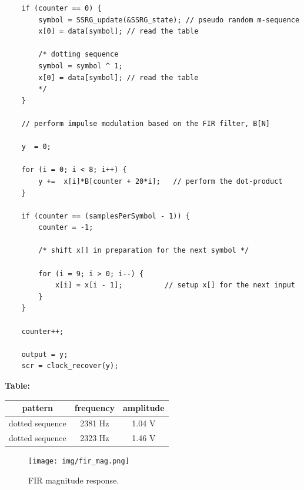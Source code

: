 \documentclass{article}
\begin{document}
\begin{verbatim}
	if (counter == 0) {
		symbol = SSRG_update(&SSRG_state); // pseudo random m-sequence
		x[0] = data[symbol]; // read the table

		/* dotting sequence
		symbol = symbol ^ 1;
		x[0] = data[symbol]; // read the table
		*/
	}

	// perform impulse modulation based on the FIR filter, B[N] 

	y  = 0;

	for (i = 0; i < 8; i++) {
		y +=  x[i]*B[counter + 20*i];	// perform the dot-product
	}

	if (counter == (samplesPerSymbol - 1)) {
		counter = -1; 

		/* shift x[] in preparation for the next symbol */

		for (i = 9; i > 0; i--) {
			x[i] = x[i - 1];          // setup x[] for the next input
		}
	}

	counter++;

	output = y;
	scr = clock_recover(y);
\end{verbatim}

\textbf{Table:}

\begin{center}
\begin{tabular}{c|c|c}
pattern	&	frequency & amplitude \\ \hline
dotted sequence	&	 2381 Hz	&	1.04 V				\\ \hline
dotted sequence	&	 2323 Hz	&	1.46 V				\\ \hline
\end{tabular}
\end{center}

\begin{figure}[h]
  \begin{center}
    \texttt{[image: img/fir\_mag.png]}
    \caption{FIR magnitude response.}
  \end{center}
\end{figure}
\end{document}
